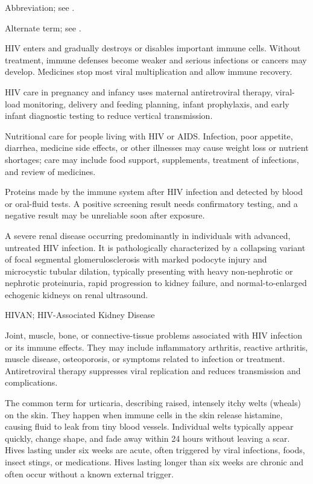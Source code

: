  Abbreviation; see .

 Alternate term; see .

 HIV enters and gradually destroys or disables important immune cells. Without treatment, immune defenses become weaker and serious infections or cancers may develop. Medicines stop most viral multiplication and allow immune recovery.

 HIV care in pregnancy and infancy uses maternal antiretroviral therapy, viral-load monitoring, delivery and feeding planning, infant prophylaxis, and early infant diagnostic testing to reduce vertical transmission.

 Nutritional care for people living with HIV or AIDS. Infection, poor appetite, diarrhea, medicine side effects, or other illnesses may cause weight loss or nutrient shortages; care may include food support, supplements, treatment of infections, and review of medicines.

 Proteins made by the immune system after HIV infection and detected by blood or oral-fluid tests. A positive screening result needs confirmatory testing, and a negative result may be unreliable soon after exposure.

 A severe renal disease occurring predominantly in individuals with advanced, untreated HIV infection. It is pathologically characterized by a collapsing variant of focal segmental glomerulosclerosis with marked podocyte injury and microcystic tubular dilation, typically presenting with heavy non-nephrotic or nephrotic proteinuria, rapid progression to kidney failure, and normal-to-enlarged echogenic kidneys on renal ultrasound.

\synonyms
HIVAN; HIV-Associated Kidney Disease

 Joint, muscle, bone, or connective-tissue problems associated with HIV infection or its immune effects. They may include inflammatory arthritis, reactive arthritis, muscle disease, osteoporosis, or symptoms related to infection or treatment.
Antiretroviral therapy suppresses viral replication and reduces transmission and complications.

 The common term for urticaria, describing raised, intensely itchy welts (wheals) on the skin. They happen when immune cells in the skin release histamine, causing fluid to leak from tiny blood vessels. Individual welts typically appear quickly, change shape, and fade away within 24 hours without leaving a scar. Hives lasting under six weeks are acute, often triggered by viral infections, foods, insect stings, or medications. Hives lasting longer than six weeks are chronic and often occur without a known external trigger.

